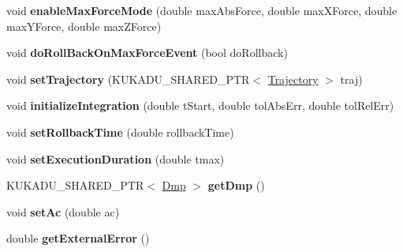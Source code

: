 \begin{DoxyCompactItemize}
\item 
void {\bfseries enable\+Max\+Force\+Mode} (double max\+Abs\+Force, double max\+X\+Force, double max\+Y\+Force, double max\+Z\+Force)\hypertarget{classkukadu_1_1DMPExecutor_a48f9f9b4b12ebce4423c0258be1c6eb5}{}\label{classkukadu_1_1DMPExecutor_a48f9f9b4b12ebce4423c0258be1c6eb5}

\item 
void {\bfseries do\+Roll\+Back\+On\+Max\+Force\+Event} (bool do\+Rollback)\hypertarget{classkukadu_1_1DMPExecutor_a4278c7a3e74556a5e2c40a7602743852}{}\label{classkukadu_1_1DMPExecutor_a4278c7a3e74556a5e2c40a7602743852}

\item 
void {\bfseries set\+Trajectory} (K\+U\+K\+A\+D\+U\+\_\+\+S\+H\+A\+R\+E\+D\+\_\+\+P\+TR$<$ \hyperlink{classkukadu_1_1Trajectory}{Trajectory} $>$ traj)\hypertarget{classkukadu_1_1DMPExecutor_a05c30d4373ffdedf10711d66ca7e979e}{}\label{classkukadu_1_1DMPExecutor_a05c30d4373ffdedf10711d66ca7e979e}

\item 
void {\bfseries initialize\+Integration} (double t\+Start, double tol\+Abs\+Err, double tol\+Rel\+Err)\hypertarget{classkukadu_1_1DMPExecutor_a3c6748e4c5731fa8d3721fb703cb8ec8}{}\label{classkukadu_1_1DMPExecutor_a3c6748e4c5731fa8d3721fb703cb8ec8}

\item 
void {\bfseries set\+Rollback\+Time} (double rollback\+Time)\hypertarget{classkukadu_1_1DMPExecutor_afefa7096a8b289cbd80c46662fbf0cad}{}\label{classkukadu_1_1DMPExecutor_afefa7096a8b289cbd80c46662fbf0cad}

\item 
void {\bfseries set\+Execution\+Duration} (double tmax)\hypertarget{classkukadu_1_1DMPExecutor_a6dcd761e210f9c001fe02a018534e1f5}{}\label{classkukadu_1_1DMPExecutor_a6dcd761e210f9c001fe02a018534e1f5}

\item 
K\+U\+K\+A\+D\+U\+\_\+\+S\+H\+A\+R\+E\+D\+\_\+\+P\+TR$<$ \hyperlink{classkukadu_1_1Dmp}{Dmp} $>$ {\bfseries get\+Dmp} ()\hypertarget{classkukadu_1_1DMPExecutor_a22c8f37ab8d3a3e0eca810e596cb8f6f}{}\label{classkukadu_1_1DMPExecutor_a22c8f37ab8d3a3e0eca810e596cb8f6f}

\item 
void {\bfseries set\+Ac} (double ac)\hypertarget{classkukadu_1_1DMPExecutor_a2d2f09e13d7fc997e1dfae5c67c2da77}{}\label{classkukadu_1_1DMPExecutor_a2d2f09e13d7fc997e1dfae5c67c2da77}

\item 
double {\bfseries get\+External\+Error} ()\hypertarget{classkukadu_1_1DMPExecutor_af3ea91620f3c2a7686fd56a2df6c9dd1}{}\label{classkukadu_1_1DMPExecutor_af3ea91620f3c2a7686fd56a2df6c9dd1}


\end{DoxyCompactItemize}
